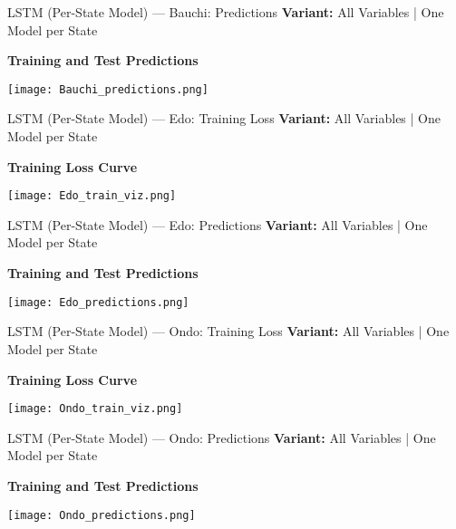 \documentclass{beamer}
\begin{document}
\begin{frame}{LSTM (Per-State Model) — Bauchi: Predictions}
\textbf{Variant:} All Variables | One Model per State
\vspace{0.5em}

\textbf{Training and Test Predictions}
\begin{center}
    \texttt{[image: Bauchi\_predictions.png]}
\end{center}
\end{frame}

\begin{frame}{LSTM (Per-State Model) — Edo: Training Loss}
\textbf{Variant:} All Variables | One Model per State
\vspace{0.5em}

\textbf{Training Loss Curve}
\begin{center}
    \texttt{[image: Edo\_train\_viz.png]}
\end{center}
\end{frame}

\begin{frame}{LSTM (Per-State Model) — Edo: Predictions}
\textbf{Variant:} All Variables | One Model per State
\vspace{0.5em}

\textbf{Training and Test Predictions}
\begin{center}
    \texttt{[image: Edo\_predictions.png]}
\end{center}
\end{frame}

\begin{frame}{LSTM (Per-State Model) — Ondo: Training Loss}
\textbf{Variant:} All Variables | One Model per State
\vspace{0.5em}

\textbf{Training Loss Curve}
\begin{center}
    \texttt{[image: Ondo\_train\_viz.png]}
\end{center}
\end{frame}

\begin{frame}{LSTM (Per-State Model) — Ondo: Predictions}
\textbf{Variant:} All Variables | One Model per State
\vspace{0.5em}

\textbf{Training and Test Predictions}
\begin{center}
    \texttt{[image: Ondo\_predictions.png]}
\end{center}
\end{frame}
\end{document}

